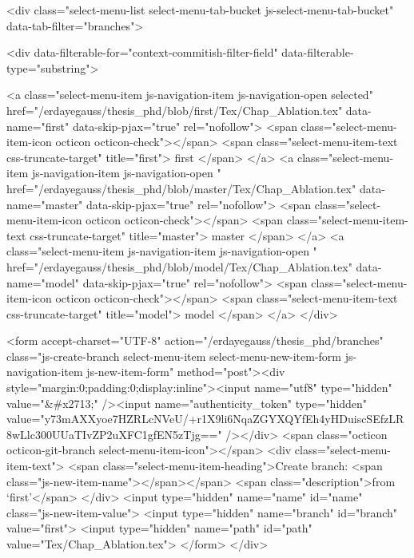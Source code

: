      <div class="select-menu-list select-menu-tab-bucket js-select-menu-tab-bucket" data-tab-filter="branches">

        <div data-filterable-for="context-commitish-filter-field" data-filterable-type="substring">


            <a class="select-menu-item js-navigation-item js-navigation-open selected"
               href="/erdayegauss/thesis_phd/blob/first/Tex/Chap_Ablation.tex"
               data-name="first"
               data-skip-pjax="true"
               rel="nofollow">
              <span class="select-menu-item-icon octicon octicon-check"></span>
              <span class="select-menu-item-text css-truncate-target" title="first">
                first
              </span>
            </a>
            <a class="select-menu-item js-navigation-item js-navigation-open "
               href="/erdayegauss/thesis_phd/blob/master/Tex/Chap_Ablation.tex"
               data-name="master"
               data-skip-pjax="true"
               rel="nofollow">
              <span class="select-menu-item-icon octicon octicon-check"></span>
              <span class="select-menu-item-text css-truncate-target" title="master">
                master
              </span>
            </a>
            <a class="select-menu-item js-navigation-item js-navigation-open "
               href="/erdayegauss/thesis_phd/blob/model/Tex/Chap_Ablation.tex"
               data-name="model"
               data-skip-pjax="true"
               rel="nofollow">
              <span class="select-menu-item-icon octicon octicon-check"></span>
              <span class="select-menu-item-text css-truncate-target" title="model">
                model
              </span>
            </a>
        </div>

          <form accept-charset="UTF-8" action="/erdayegauss/thesis_phd/branches" class="js-create-branch select-menu-item select-menu-new-item-form js-navigation-item js-new-item-form" method="post"><div style="margin:0;padding:0;display:inline"><input name="utf8" type="hidden" value="&#x2713;" /><input name="authenticity_token" type="hidden" value="y73mAXXyoe7HZRLcNVeU/+r1X9li6NqaZGYXQYfEh4yHDuiscSEfzLR8wLlc300UUaTIvZP2uXFC1gfEN5zTjg==" /></div>
            <span class="octicon octicon-git-branch select-menu-item-icon"></span>
            <div class="select-menu-item-text">
              <span class="select-menu-item-heading">Create branch: <span class="js-new-item-name"></span></span>
              <span class="description">from ‘first’</span>
            </div>
            <input type="hidden" name="name" id="name" class="js-new-item-value">
            <input type="hidden" name="branch" id="branch" value="first">
            <input type="hidden" name="path" id="path" value="Tex/Chap_Ablation.tex">
</form>
      </div>

